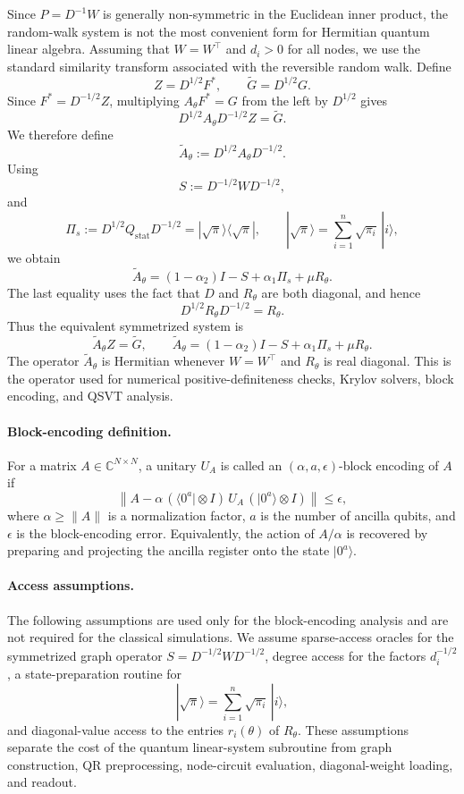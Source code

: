 \documentclass[11pt,a4paper]{article}
\renewcommand{\C}{\mathbb{C}}
\newcommand{\C}{\mathbb{C}}
\begin{document}
Since \(P=D^{-1}W\) is generally non-symmetric in the Euclidean inner product,
the random-walk system is not the most convenient form for Hermitian quantum
linear algebra. Assuming that \(W=W^\top\) and \(d_i>0\) for all nodes, we use
the standard similarity transform associated with the reversible random walk.
Define
\[
Z=D^{1/2}F^\ast,
\qquad
\widetilde G=D^{1/2}G.
\]
Since \(F^\ast=D^{-1/2}Z\), multiplying \(A_\theta F^\ast=G\) from the left by
\(D^{1/2}\) gives
\[
D^{1/2}A_\theta D^{-1/2}Z=\widetilde G.
\]
We therefore define
\[
\widetilde A_\theta:=D^{1/2}A_\theta D^{-1/2}.
\]
Using
\[
S:=D^{-1/2}WD^{-1/2},
\]
and
\[
\Pi_s
:=
D^{1/2}Q_{\mathrm{stat}}D^{-1/2}
=
|\sqrt{\pi}\rangle\langle\sqrt{\pi}|,
\qquad
|\sqrt{\pi}\rangle
=
\sum_{i=1}^n\sqrt{\pi_i}\,|i\rangle,
\]
we obtain
\[
\widetilde A_\theta
=
(1-\alpha_2)I-S+\alpha_1\Pi_s+\mu R_\theta.
\]
The last equality uses the fact that \(D\) and \(R_\theta\) are both diagonal,
and hence
\[
D^{1/2}R_\theta D^{-1/2}=R_\theta.
\]
Thus the equivalent symmetrized system is
 \begin{equation}
\widetilde A_\theta Z=\widetilde G,
\qquad
\widetilde A_\theta
=
(1-\alpha_2)I-S+\alpha_1\Pi_s+\mu R_\theta.
\label{eq:symmetrized_system}
\end{equation}
The operator \(\widetilde A_\theta\) is Hermitian whenever \(W=W^\top\) and
\(R_\theta\) is real diagonal. This is the operator used for numerical
positive-definiteness checks, Krylov solvers, block encoding, and QSVT
analysis.



\paragraph{Block-encoding definition.}
For a matrix $A \in \C^{N\times N}$, a unitary $U_A$ is called an
$(\alpha, a, \epsilon)$-block encoding of $A$ if
\[
\left\|
A
-
\alpha\,(\langle 0^a \rvert \otimes I)\, U_A\, (\lvert 0^a \rangle \otimes I)
\right\|
\leq \epsilon,
\]
where $\alpha \geq \|A\|$ is a normalization factor, $a$ is the number of
ancilla qubits, and $\epsilon$ is the block-encoding error. Equivalently, the
action of $A/\alpha$ is recovered by preparing and projecting the ancilla
register onto the state $\lvert 0^a \rangle$.

\paragraph{Access assumptions.}
The following assumptions are used only for the block-encoding analysis and
are not required for the classical simulations. We assume sparse-access oracles
for the symmetrized graph operator \(S=D^{-1/2}WD^{-1/2}\), degree access for
the factors \(d_i^{-1/2}\), a state-preparation routine for
\[
|\sqrt{\pi}\rangle=\sum_{i=1}^n\sqrt{\pi_i}\,|i\rangle,
\]
and diagonal-value access to the entries \(r_i(\theta)\) of
\(R_\theta\). These assumptions separate the cost of the quantum
linear-system subroutine from graph construction, QR preprocessing,
node-circuit evaluation, diagonal-weight loading, and readout.
\end{document}
